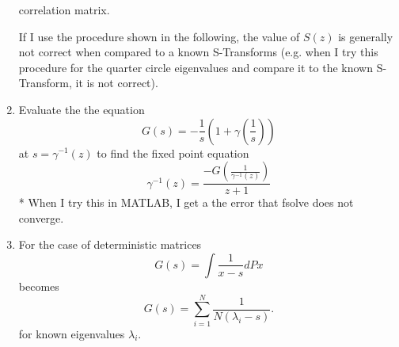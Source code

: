 \documentclass[12pt,a4paper]{report}
\begin{document}
\begin{enumerate}
		 correlation matrix. 
		 \par
		 If I use the procedure shown in the following, the value of $S(z)$ is 
		generally not correct when compared to a known S-Transforms (e.g. when I try this procedure for the 
		quarter circle eigenvalues and compare it to the known S-Transform, it is not correct).
	\item
		Evaluate the the equation 
		\begin{equation}
		G(s)=  -\frac{1}{s} (1+\gamma\left(\frac{1}{s}\right))
		\end{equation}
		at $s = \gamma^{-1}(z)$ 
		to find the fixed point equation
		 \begin{equation}
		\gamma^{-1}(z) = \frac{-G(\frac{1}{\gamma^{-1}(z)})}{z+1}
		\end{equation}
		* When I try this in MATLAB, I get a the error that fsolve does not converge.
	\item 
		For the case of deterministic matrices 
		\begin{equation}
		G(s) = \int \frac{1}{x-s} dPx
		\end{equation}
		becomes 
		\begin{equation}
		G(s) = \sum_{i=1}^{N} \frac{1}{N (\lambda_i - s)}.
		\end{equation}	
		for known eigenvalues $\lambda_i$.
	\end{enumerate}
\end{document}
